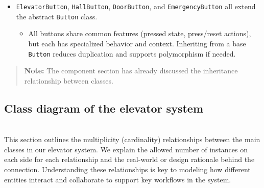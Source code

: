 \begin{itemize}
\item
\protect{}\label{c4IzTYrD6Sirfosp_4Ggg}
\texttt{ElevatorButton}, \texttt{HallButton}, \texttt{DoorButton}, and \texttt{EmergencyButton} all extend the abstract \texttt{Button} class.

\begin{itemize}
\item
All buttons share common features (pressed state, press/reset actions), but each has specialized behavior and context. Inheriting from a base \texttt{Button} reduces duplication and supports polymorphism if needed.
\end{itemize}
\end{itemize}
\begin{quote}
\textbf{Note:} The component section has already discussed the inheritance relationship between classes.
\end{quote}
\subsection{Class diagram of the elevator system}\label{Ga2LWnDWbLs5V7wrqdXVX}
\\
This section outlines the multiplicity (cardinality) relationships between the main classes in our elevator system. We explain the allowed number of instances on each side for each relationship and the real-world or design rationale behind the connection. Understanding these relationships is key to modeling how different entities interact and collaborate to support key workflows in the system.

